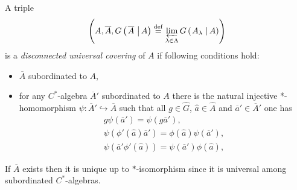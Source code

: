 \documentclass{beamer}
\theoremstyle{plain}
\newcommand{\be}{\begin{equation}}
\newcommand{\ee}{\end{equation}}
\newcommand{\la}{\lambda}
\newcommand{\La}{\Lambda}
\newcommand{\bydef}{\stackrel{\mathrm{def}}{=}}
\newcommand{\hookto}{\hookrightarrow}        %
\begin{document}
\begin{frame}
 \begin{definition}\label{disconnected_infinite_noncommutative_covering_defn}
 	A triple
 	\be\label{disc_triple_eqn}
 \left(A, \overline{A}, G\left(\left.\overline{A}~\right| A\right)\bydef  \varprojlim_{\la\in\La}G\left(\left.A_\la~\right| A\right)\right)
 \ee
	is a \textit{disconnected universal covering} of $A$ if following conditions hold:
\begin{itemize}
	\item $\overline{A}$ subordinated to	$A$,
	\item  for any $C^*$-algebra $\overline{A}'$ subordinated to	$A$  there is the natural injective *-homomorphism
	$\psi : \overline{A}'\hookto\overline{A}$ such that all
	$g \in \widehat{G}$,  $\widehat a \in \widehat{A}$ and $\overline a' \in \overline{A}'$ one has
	\be\label{disconnected_lim_eqn}
	\begin{split}
		g \psi\left( \overline{a}'\right) = \psi\left(g \overline{a}'\right),\\
		\psi\left(\phi'\left( \widehat  a\right)\overline a'  \right) = 	\phi\left( \widehat  a\right)\psi\left( \overline a'  \right),\\
		\psi\left(\overline a' \phi'\left( \widehat  a\right) \right) = 	\psi\left( \overline a'  \right)\phi\left( \widehat  a\right),
	\end{split}
	\ee
\end{itemize}	
\end{definition}
If $\overline{A}$ exists then it is unique up to $*$-isomorphism since it is universal among subordinated $C^*$-algebras.
\end{frame}
\end{document}
